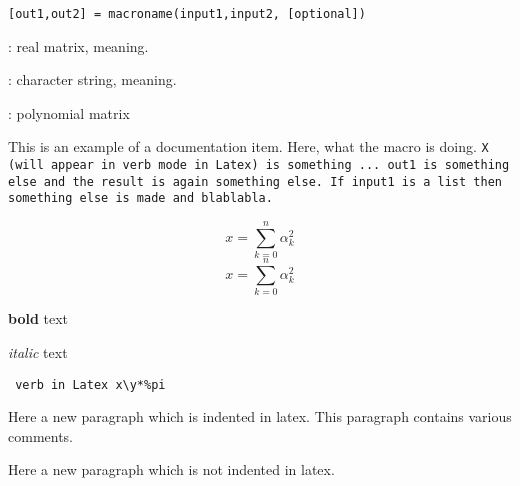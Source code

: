 


%
%


\label{macroname}

\begin{verbatim}
[out1,out2] = macroname(input1,input2, [optional])
\end{verbatim}
\begin{scitem}
\item[{\tt input1}]
: real matrix, meaning.
\item[{\tt input2}]
: character string, meaning.
\item[{\tt out1}]
: polynomial matrix
\end{scitem}%
This is an example of a documentation item.
Here, what the macro is doing. %
\tt X %
\rm (will appear in verb mode in Latex) 
is something ... %
\tt out1 %
\rm is something else
and the result is again something else. If %
\tt input1 %
\rm is a list then 
something else is made and blablabla.
 \[ x=\sum_{k=0}^n \alpha_k^2 \]
 \[ x=\sum_{k=0}^n \alpha_k^2 \]\par
{}
\par
{\bf bold} text
\par
{\it italic} text
\par
\par
\verb? verb in Latex x\y*%pi?
\par
Here a new paragraph which is indented in latex. 
This paragraph contains various  comments.
\par\noindent
Here a new paragraph which is not indented in latex.
